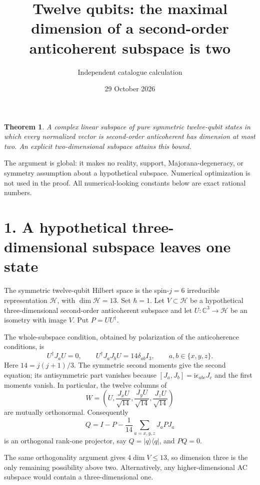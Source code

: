 \documentclass[11pt]{article}
\title{Twelve qubits: the maximal dimension of a second-order anticoherent subspace is two}
\author{Independent catalogue calculation}
\date{29 October 2026}
\newtheorem{theorem}{Theorem}
\newcommand{\ii}{\mathrm{i}}
\begin{document}
\maketitle
\begin{theorem}
A complex linear subspace of pure symmetric twelve-qubit states in which every normalized vector is second-order anticoherent has dimension at most two. An explicit two-dimensional subspace attains this bound.
\end{theorem}
The argument is global: it makes no reality, support, Majorana-degeneracy, or symmetry assumption about a hypothetical subspace. Numerical optimization is not used in the proof. All numerical-looking constants below are exact rational numbers.

\section*{1. A hypothetical three-dimensional subspace leaves one state}
The symmetric twelve-qubit Hilbert space is the spin-$j=6$ irreducible representation $\mathcal H$, with $\dim\mathcal H=13$. Set $\hbar=1$. Let $V\subset\mathcal H$ be a hypothetical three-dimensional second-order anticoherent subspace and let $U:\mathbb C^3\to\mathcal H$ be an isometry with image $V$. Put $P=UU^\dagger$.

The whole-subspace condition, obtained by polarization of the anticoherence conditions, is
\begin{equation}
 U^\dagger J_aU=0,\qquad U^\dagger J_aJ_bU=14\delta_{ab}I_3,
 \qquad a,b\in\{x,y,z\}.
 \label{eq:compression}
\end{equation}
Here $14=j(j+1)/3$. The symmetric second moments give the second equation; its antisymmetric part vanishes because $[J_a,J_b]=\ii\epsilon_{abc}J_c$ and the first moments vanish. In particular, the twelve columns of
\[
 W=\left(U,\frac{J_xU}{\sqrt{14}},\frac{J_yU}{\sqrt{14}},\frac{J_zU}{\sqrt{14}}\right)
\]
are mutually orthonormal. Consequently
\begin{equation}
 Q=I-P-\frac1{14}\sum_{a=x,y,z}J_aPJ_a
 \label{eq:complement}
\end{equation}
is an orthogonal rank-one projector, say $Q=|q\rangle\langle q|$, and $PQ=0$.

The same orthogonality argument gives $4\dim V\le13$, so dimension three is the only remaining possibility above two. Alternatively, any higher-dimensional AC subspace would contain a three-dimensional one.
\end{document}

